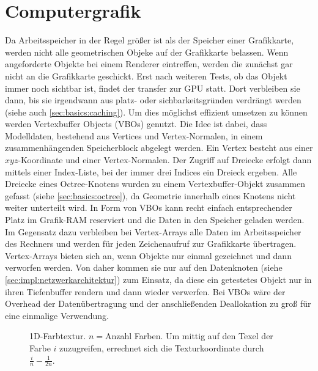 \section{Computergrafik}
\label{sec:basics:computergrafik}
Da Arbeitsspeicher in der Regel größer ist als der Speicher einer Grafikkarte, werden nicht alle geometrischen Objeke auf der Grafikkarte belassen. Wenn angeforderte Objekte bei einem Renderer eintreffen, werden die zunächst gar nicht an die Grafikkarte geschickt. Erst nach weiteren Tests, ob das Objekt immer noch sichtbar ist, findet der transfer zur GPU statt. Dort verbleiben sie dann, bis sie irgendwann aus platz- oder sichbarkeitsgründen verdrängt werden (siehe auch \ref{sec:basics:caching}). Um dies möglichst effizient umsetzen zu können werden Vertexbuffer Objects  (VBOs) genutzt. Die Idee ist dabei, dass Modelldaten, bestehend aus Vertices und Vertex-Normalen, in einem zusammenhängenden Speicherblock abgelegt werden. Ein Vertex besteht aus einer $xyz$-Koordinate und einer Vertex-Normalen. Der Zugriff auf Dreiecke erfolgt dann mittels einer Index-Liste, bei der immer drei Indices ein Dreieck ergeben. Alle Dreiecke eines Octree-Knotens wurden zu einem Vertexbuffer-Objekt zusammen gefasst (siehe \ref{sec:basics:octree}), da Geometrie innerhalb eines Knotens nicht weiter unterteilt wird. In Form von VBOs kann recht einfach entsprechender Platz im Grafik-RAM reserviert und die Daten in den Speicher geladen werden.\\
Im Gegensatz dazu verbleiben bei Vertex-Arrays alle Daten im Arbeitsspeicher des Rechners und werden für jeden Zeichenaufruf zur Grafikkarte übertragen. Vertex-Arrays bieten sich an, wenn Objekte nur einmal gezeichnet und dann verworfen werden. Von daher kommen sie nur auf den Datenknoten (siehe \ref{sec:impl:netzwerkarchitektur}) zum Einsatz, da diese ein getestetes Objekt nur in ihren Tiefenbuffer rendern und dann wieder verwerfen. Bei VBOs wäre der Overhead der Datenübertragung und der anschließenden Deallokation zu groß für eine einmalige Verwendung.
\begin{figure}
  \centering
  
  \caption{1D-Farbtextur. $n=$Anzahl Farben. Um mittig auf den Texel der Farbe $i$ zuzugreifen, errechnet sich die Texturkoordinate durch $\frac{i}{n}-\frac{1}{2n}$. }
  \label{fig:basics:1dtexture}
\end{figure}


